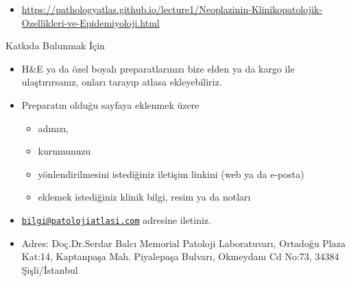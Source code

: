 \documentclass[
  letterpaper,
  DIV=11,
  numbers=noendperiod]{scrreprt}
\providecommand{\tightlist}{%
  \setlength{\itemsep}{0pt}\setlength{\parskip}{0pt}}
\begin{document}
\begin{itemize}
\tightlist
\item
  \url{https://pathologyatlas.github.io/lecture1/Neoplazinin-Klinikopatolojik-Ozellikleri-ve-Epidemiyoloji.html}
\end{itemize}

Katkıda Bulunmak İçin

\begin{itemize}
\item
  H\&E ya da özel boyalı preparatlarınızı bize elden ya da kargo ile
  ulaştırırsanız, onları tarayıp atlasa ekleyebiliriz.
\item
  Preparatın olduğu sayfaya eklenmek üzere

  \begin{itemize}
  \item
    adınızı,
  \item
    kurumunuzu
  \item
    yönlendirilmesini istediğiniz iletişim linkini (web ya da e-posta)
  \item
    eklemek istediğiniz klinik bilgi, resim ya da notları
  \end{itemize}
\item
  \href{mailto:bilgi@patolojiatlasi.com}{\nolinkurl{bilgi@patolojiatlasi.com}}
  adresine iletiniz.
\item
  Adres: Doç.Dr.Serdar Balcı Memorial Patoloji Laboratuvarı, Ortadoğu
  Plaza Kat:14, Kaptanpaşa Mah. Piyalepaşa Bulvarı, Okmeydanı Cd No:73,
  34384 Şişli/İstanbul
\end{itemize}
\end{document}
